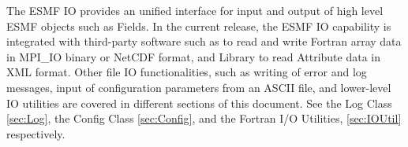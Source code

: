 

The ESMF IO provides an unified interface for input and output of
high level ESMF objects such as Fields.  In the current release, the ESMF IO 
capability is integrated with third-party software such as 
to read and write Fortran array data in MPI\_IO binary or NetCDF format, and 
Library to read Attribute data in XML format.  Other file IO
functionalities, such as writing of error and log messages, input of
configuration parameters from an ASCII file, and lower-level IO utilities are 
covered in different sections of this document.  See the Log Class 
\ref{sec:Log}, the Config Class \ref{sec:Config}, and the Fortran 
I/O Utilities, \ref{sec:IOUtil} respectively.


%
%


